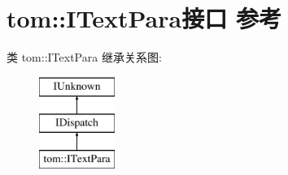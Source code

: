 \hypertarget{interfacetom_1_1_i_text_para}{}\section{tom\+:\+:I\+Text\+Para接口 参考}
\label{interfacetom_1_1_i_text_para}
类 tom\+:\+:I\+Text\+Para 继承关系图\+:\begin{figure}[H]
\begin{center}
\leavevmode
\includegraphics[height=3.000000cm]{interfacetom_1_1_i_text_para}
\end{center}
\end{figure}

